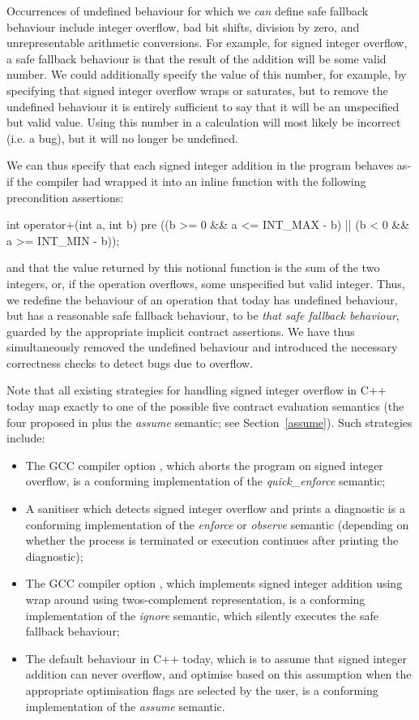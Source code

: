 Occurrences of undefined behaviour for which we \emph{can} define safe fallback behaviour include integer overflow, bad bit shifts, division by zero, and unrepresentable arithmetic conversions. For example, for signed integer overflow, a safe fallback behaviour is that the result of the addition will be some valid number. We could additionally specify the value of this number, for example, by specifying that signed integer overflow wraps or saturates, but to remove the undefined behaviour it is entirely sufficient to say that it will be an unspecified but valid value. Using this number in a calculation will most likely be incorrect (i.e. a bug), but it will no longer be undefined.

We can thus specify that each signed integer addition in the program behaves as-if the compiler had wrapped it into an inline function with the following precondition assertions:
\begin{codeblock}
int operator+(int a, int b)
pre ((b >= 0 && a <= INT_MAX - b) || (b < 0 && a >= INT_MIN - b));
\end{codeblock}
and that the value returned by this notional function is the sum of the two integers, or, if the operation overflows, some unspecified but valid integer. Thus, we redefine the behaviour of an operation that today has undefined behaviour, but has a reasonable safe fallback behaviour, to be \emph{that safe fallback behaviour}, guarded by the appropriate implicit contract assertions. We have thus simultaneously removed the undefined behaviour and introduced the necessary correctness checks to detect bugs due to overflow.

Note that all existing strategies for handling signed integer overflow in C++ today map exactly to one of the possible five contract evaluation semantics (the four proposed in \cite{P2900R9} plus the \emph{assume} semantic; see Section~\ref{assume}). Such strategies include:
\begin{itemize}
\item The GCC compiler option , which aborts the program on signed integer overflow, is a conforming implementation of the \emph{quick_enforce} semantic;
\item A sanitiser which detects signed integer overflow and prints a diagnostic is a conforming
implementation of the \emph{enforce} or \emph{observe} semantic (depending on whether the
process is terminated or execution continues after printing the diagnostic);
\item The GCC compiler option , which implements signed integer addition using wrap around using twos-complement representation, is a conforming implementation of the \emph{ignore} semantic, which silently executes the safe fallback behaviour;
\item The default behaviour in C++ today, which is to assume that signed integer addition can never overflow, and optimise based on this assumption when the appropriate optimisation flags are selected by the user, is a conforming implementation of the \emph{assume} semantic.
\end{itemize}

